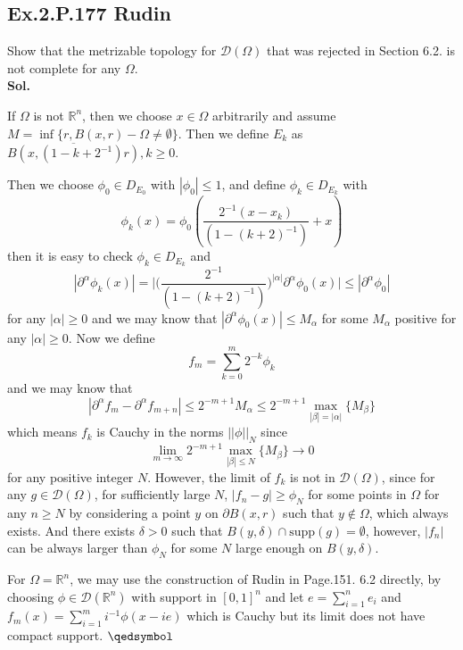 \documentclass[lang=en,11pt,a4paper,citestyle =authoryear]{elegantpaper}
\newcommand{\prvd}{$\hfill \qedsymbol$}
\newcommand{\R}{\mathbb{R}}
\begin{document}
\subsection*{Ex.2.P.177 Rudin} 
Show that the metrizable topology for $\mathscr{D}(\Omega)$ that was rejected in Section 6.2. is not complete for any $\Omega$.
\vspace{0.5em}\\
\textbf{Sol.} \par
If $\Omega$ is not $\R^n$, then we choose $x\in \Omega$ arbitrarily and assume $M = \inf\{r,B(x,r)-\Omega \neq \emptyset\}$. Then we define $E_k$ as $\overline{B(x,(1-{k+2}^{-1})r)},k\geq 0$.\par
Then we choose $\phi_0 \in D_{E_0}$ with $|\phi_0|\leq 1$, and define $\phi_k \in D_{E_k}$ with
\[\phi_k(x) = \phi_0(\dfrac{2^{-1}(x-x_k)}{(1-(k+2)^{-1})}+x)\]
then it is easy to check $\phi_k \in D_{E_k}$ and
\[
|\partial^{\alpha}\phi_k(x)| = \Big|\Big(\dfrac{2^{-1}}{(1-(k+2)^{-1})}\Big)^{|\alpha|}\partial^{\alpha}\phi_0(x)\Big| \leq |\partial^{\alpha}\phi_0|
\]
for any $|\alpha|\geq 0$ and we may know that $|\partial^{\alpha}\phi_0(x)| \leq M_{\alpha}$ for some $M_{\alpha}$ positive for any $|\alpha|\geq 0$. Now we define
\[f_m = \sum\limits_{k=0}^m 2^{-k}\phi_k\]
and we may know that
\[
|\partial^{\alpha}f_m - \partial^{\alpha}f_{m+n}| \leq 2^{-m+1}M_{\alpha} \leq 2^{-m+1}\max_{|\beta| = |\alpha|}\{M_{\beta}\}
\]
which means $f_k$ is Cauchy in the norms $||\phi||_N$ since
\[\lim_{m\to\infty}2^{-m+1} \max_{|\beta| \leq N}\{M_{\beta}\} \to 0\]
for any positive integer $N$. However, the limit of $f_k$ is not in $\mathscr{D}(\Omega)$, since for any $g\in \mathscr{D}(\Omega)$, for sufficiently large $N$, $|f_n-g| \geq \phi_N$ for some points in $\Omega$ for any $n\geq N$ by considering a point $y$ on $\partial B(x,r)$ such that $y\notin\Omega$, which always exists. And there exists $\delta > 0$ such that $B(y,\delta)\cap \text{supp}(g) = \emptyset$, however, $|f_n|$ can be always larger than $\phi_N$ for some $N$ large enough on $B(y,\delta)$.\par
For $\Omega =  \R^n$, we may use the construction of Rudin in Page.151. 6.2 directly, by choosing $\phi \in \mathscr{D}(\R^n)$ with support in $[0,1]^n$ and let $e = \sum\limits_{i=1}^n e_i$ and $f_m(x) = \sum\limits_{i=1}^m i^{-1}\phi(x-ie)$ which is Cauchy but its limit does not have compact support.
\prvd
\end{document}
